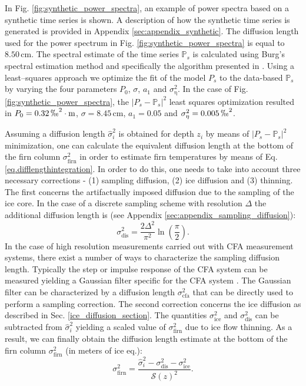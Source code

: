 \documentclass[11pt, draftcls, onecolumn]{IEEEtran} %
\numberwithin{equation}{section}
\numberwithin{table}{section}
\numberwithin{figure}{section}
\begin{document}
In Fig. \ref{fig:synthetic_power_spectra}, an example of power spectra based on a synthetic time series is shown. 
A description of how the synthetic time series is generated is provided in Appendix \ref{sec:appendix_synthetic}.
The diffusion length used for the power spectrum in Fig. \ref{fig:synthetic_power_spectra} is equal to $8.50 \, \mathrm{cm}$.
The spectral estimate of the time series $\mathbb{P}_s$ 
is calculated using Burg's spectral estimation method
\citep{Kay1981} and specifically the algorithm presented in \cite{Andersen1974}. 
Using a least--squares approach we optimize the fit of the model $P_s$ to the data-based $\mathbb{P}_s$ by varying the four 
parameters $P_0$, $\sigma$, $a_1$ and $\sigma_{\mathrm{\eta}}^2$.
In the case of Fig. \ref{fig:synthetic_power_spectra},
the $\vert P_s - \mathbb{P}_s \vert^2$ least squares optimization resulted in 
$P_0=0.32\,\permil^2\cdot \mathrm{m}$, $\sigma = 8.45 \, \mathrm{cm}$, $a_1 = 0.05$ and $\sigma_{\mathrm{\eta}}^2 =0.005 \, \permil^2$.


Assuming a diffusion length $\widehat{\sigma}_i^2$ is obtained for depth $z_i$ by means of 
$\vert P_s - \mathbb{P}_s \vert^2$ minimization, one can calculate the equivalent diffusion 
length at the bottom of the firn column $\sigma^2_{\mathrm{firn}}$ in order to estimate firn temperatures
by means of Eq. \ref{eq.difflengthintegration}. 
In order to do this, one needs to take into account three necessary corrections
- (1) sampling diffusion, (2) ice diffusion and (3) thinning. 
The first concerns the artifactually imposed
diffusion due to the sampling of the ice core. 
In the case of a discrete sampling scheme with resolution $\Delta$ the additional 
diffusion length is (see Appendix \ref{sec:appendix_sampling_diffusion}): 
\begin{equation}
\sigma^2_{\mathrm{dis}} = \frac{2\Delta^2}{\pi^2}\ln{\left(\frac{\pi}{2}\right)}.
\label{sampling_sigma}
\end{equation}
In the case of high resolution measurements carried out with CFA measurement systems, there
exist a number of ways to characterize the sampling diffusion length. 
Typically the step or impulse response of the CFA system can be measured yielding a Gaussian  
filter specific for the CFA system \citep{Gkinis2011, Maselli2013, Emanuelsson2015, Jones2017a}. 
The Gaussian filter can be characterized by a diffusion 
length $\sigma^2_{\mathrm{cfa}}$ that can be directly used to perform a sampling correction.
The second correction concerns the ice diffusion as described in Sec. \ref{ice_diffusion_section}.
The quantities $\sigma^2_{\mathrm{ice}}$ and $\sigma^2_{\mathrm{dis}}$ can be subtracted from 
$\widehat{\sigma}_i^2$ yielding a scaled value   of $\sigma^2_{\mathrm{firn}}$ due to ice flow thinning.
As a result,  we can finally obtain the diffusion length estimate at the bottom of the firn column $\sigma^2_{\mathrm{firn}}$ (in meters of ice eq.):
\begin{equation} 
\sigma^2_\text{firn} = \frac{\widehat{\sigma}_i^2 - \sigma^2_\text{dis} - \sigma^2_\text{ice}}{{\mathcal{S}(z)}^{2}}.
\label{eq.firn_data}
\end{equation}
\end{document}
